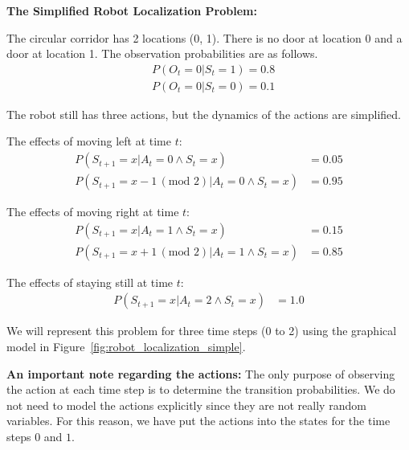 \documentclass[12pt]{article}
\begin{document}
{\bf The Simplified Robot Localization Problem: }

The circular corridor has 2 locations (0, 1). There is no door at location 0 and a door at location 1. The observation probabilities are as follows.
\begin{align}
& P(O_t = 0 | S_t = 1) = 0.8 \\
& P(O_t = 0 | S_t = 0) = 0.1 
\end{align}

The robot still has three actions, but the dynamics of the actions are simplified. 

The effects of moving left at time $t$:
\begin{align}
P(S_{t+1} = x | A_t = 0\land S_t = x) & = 0.05 \\    
P(S_{t+1} = x - 1 \,(\text{mod } 2) | A_t = 0 \land S_t = x) & = 0.95
\end{align}

The effects of moving right at time $t$:
\begin{align}
P(S_{t+1} = x | A_t = 1\land S_t = x) & = 0.15 \\    
P(S_{t+1} = x + 1 \,(\text{mod } 2) | A_t = 1 \land S_t = x) & = 0.85
\end{align}

The effects of staying still at time $t$:
\begin{align}
P(S_{t+1} = x | A_t = 2\land S_t = x) & = 1.0
\end{align}

We will represent this problem for three time steps (0 to 2) using the graphical model in Figure~\ref{fig:robot_localization_simple}.  

{\bf An important note regarding the actions: } The only purpose of observing the action at each time step is to determine the transition probabilities. We do not need to model the actions explicitly since they are not really random variables. For this reason, we have put the actions into the states for the time steps $0$ and $1$.

\end{document}
